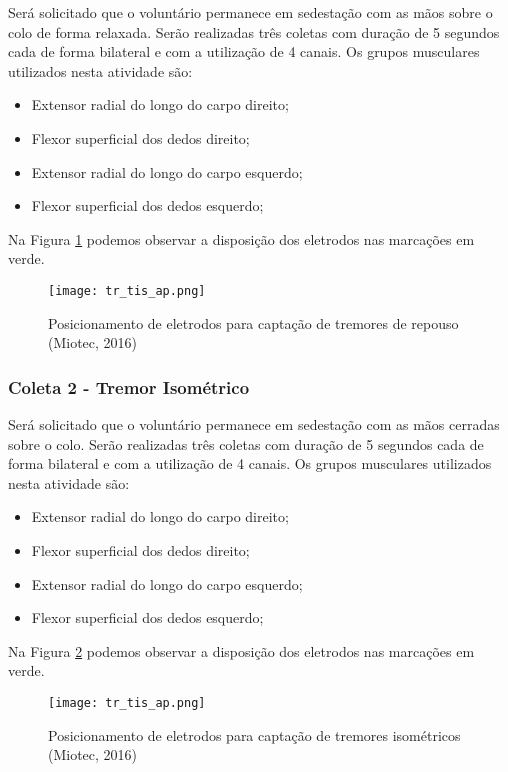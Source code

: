 \documentclass[a4paper,12pt]{report}
\begin{document}
Será solicitado que o voluntário permanece em sedestação com as mãos sobre o colo de forma relaxada. Serão realizadas três coletas com duração de 5 segundos cada de forma bilateral e com a utilização de 4 canais. Os grupos musculares utilizados nesta atividade são: 

\begin{itemize}
\item Extensor radial do longo do carpo direito;
\item Flexor superficial dos dedos direito;
\item Extensor radial do longo do carpo esquerdo;
\item Flexor superficial dos dedos esquerdo;
\end{itemize}

Na Figura \ref{fig2} podemos observar a disposição dos eletrodos nas marcações em verde.

\begin{figure}[!h]
\centering
\texttt{[image: tr\_tis\_ap.png]}
\caption{Posicionamento de eletrodos para captação de tremores de repouso (Miotec, 2016)}\label{fig2}
\end{figure}



\subsubsection*{Coleta 2 - Tremor Isométrico}

Será solicitado que o voluntário permanece em sedestação com as mãos cerradas sobre o colo. Serão realizadas três coletas com duração de 5 segundos cada de forma bilateral e com a utilização de 4 canais. Os grupos musculares utilizados nesta atividade são: 

\begin{itemize}
\item Extensor radial do longo do carpo direito;
\item Flexor superficial dos dedos direito;
\item Extensor radial do longo do carpo esquerdo;
\item Flexor superficial dos dedos esquerdo;
\end{itemize}

Na Figura \ref{fig3} podemos observar a disposição dos eletrodos nas marcações em verde.

\begin{figure}[!h]
\centering
\texttt{[image: tr\_tis\_ap.png]}
\caption{Posicionamento de eletrodos para captação de tremores isométricos (Miotec, 2016)}\label{fig3}
\end{figure}
\end{document}
